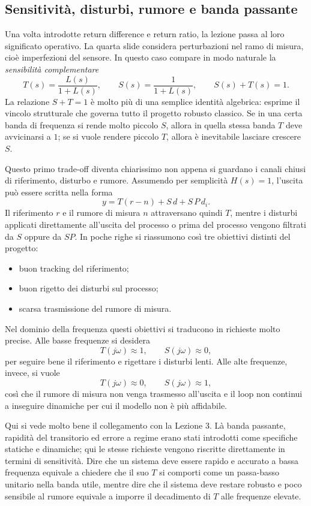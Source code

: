 \documentclass[11pt,a4paper]{article}
\begin{document}
\subsection{Sensitività, disturbi, rumore e banda passante}

Una volta introdotte return difference e return ratio, la lezione passa al loro significato operativo. La quarta slide considera perturbazioni nel ramo di misura, cioè imperfezioni del sensore. In questo caso compare in modo naturale la \emph{sensibilità complementare}
$$
T(s)=\frac{L(s)}{1+L(s)},
\qquad
S(s)=\frac{1}{1+L(s)},
\qquad
S(s)+T(s)=1.
$$
La relazione $S+T=1$ è molto più di una semplice identità algebrica: esprime il vincolo strutturale che governa tutto il progetto robusto classico. Se in una certa banda di frequenza si rende molto piccolo $S$, allora in quella stessa banda $T$ deve avvicinarsi a $1$; se si vuole rendere piccolo $T$, allora è inevitabile lasciare crescere $S$.

Questo primo trade-off diventa chiarissimo non appena si guardano i canali chiusi di riferimento, disturbo e rumore. Assumendo per semplicità $H(s)=1$, l’uscita può essere scritta nella forma
$$
y = T(r-n) + S\,d + S\,P\,d_i.
$$
Il riferimento $r$ e il rumore di misura $n$ attraversano quindi $T$, mentre i disturbi applicati direttamente all’uscita del processo o prima del processo vengono filtrati da $S$ oppure da $SP$. In poche righe si riassumono così tre obiettivi distinti del progetto:
\begin{itemize}
    \item buon tracking del riferimento;
    \item buon rigetto dei disturbi sul processo;
    \item scarsa trasmissione del rumore di misura.
\end{itemize}

Nel dominio della frequenza questi obiettivi si traducono in richieste molto precise. Alle basse frequenze si desidera
$$
T(j\omega)\approx 1,
\qquad
S(j\omega)\approx 0,
$$
per seguire bene il riferimento e rigettare i disturbi lenti. Alle alte frequenze, invece, si vuole
$$
T(j\omega)\approx 0,
\qquad
S(j\omega)\approx 1,
$$
così che il rumore di misura non venga trasmesso all’uscita e il loop non continui a inseguire dinamiche per cui il modello non è più affidabile.

Qui si vede molto bene il collegamento con la Lezione 3. Là banda passante, rapidità del transitorio ed errore a regime erano stati introdotti come specifiche statiche e dinamiche; qui le stesse richieste vengono riscritte direttamente in termini di sensitività. Dire che un sistema deve essere rapido e accurato a bassa frequenza equivale a chiedere che il suo $T$ si comporti come un passa-basso unitario nella banda utile, mentre dire che il sistema deve restare robusto e poco sensibile al rumore equivale a imporre il decadimento di $T$ alle frequenze elevate.
\end{document}
